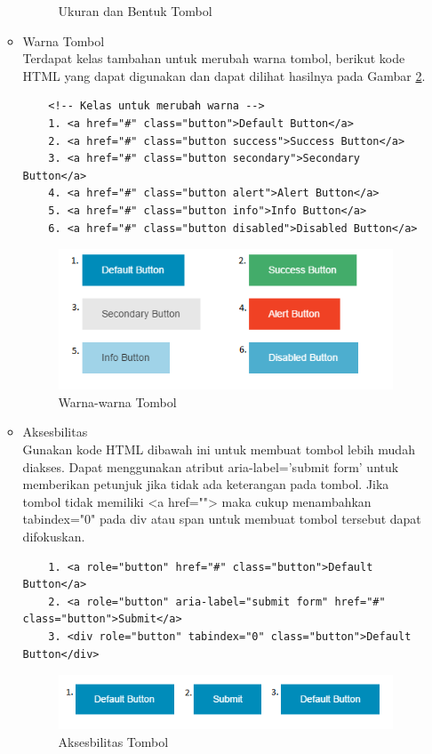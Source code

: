 \begin{enumerate}[(1)]
\begin{itemize}
\begin{figure}[H]
	\caption[Ukuran dan Bentuk Tombol]{Ukuran dan Bentuk Tombol}
	\label{fig:ukurantombol}
	\end{figure}
  \item Warna Tombol\\
  Terdapat kelas tambahan untuk merubah warna tombol, berikut kode
  HTML yang dapat digunakan dan dapat dilihat hasilnya pada Gambar
  \ref{fig:warnatombol}.
  	\begin{lstlisting}
  	<!-- Kelas untuk merubah warna -->
	1. <a href="#" class="button">Default Button</a>
	2. <a href="#" class="button success">Success Button</a>
	3. <a href="#" class="button secondary">Secondary Button</a>
	4. <a href="#" class="button alert">Alert Button</a>
	5. <a href="#" class="button info">Info Button</a>
	6. <a href="#" class="button disabled">Disabled Button</a>
  	\end{lstlisting}
  	\begin{figure}[H]
	\centering
	\includegraphics[scale=1]{Gambar/warnatombol.png}
	\caption[Warna-warna Tombol]{Warna-warna Tombol}
	\label{fig:warnatombol}
	\end{figure}
  \item Aksesbilitas\\
  Gunakan kode HTML dibawah ini untuk membuat tombol lebih mudah diakses. Dapat
  menggunakan atribut aria-label='submit form' untuk memberikan petunjuk jika
  tidak ada keterangan pada tombol. Jika tombol tidak memiliki <a href="">
  maka cukup menambahkan tabindex="0" pada div atau span untuk membuat tombol
  tersebut dapat difokuskan.
  	\begin{lstlisting}
  	1. <a role="button" href="#" class="button">Default Button</a>
	2. <a role="button" aria-label="submit form" href="#" class="button">Submit</a>
	3. <div role="button" tabindex="0" class="button">Default Button</div>
  	\end{lstlisting}
  	\begin{figure}[H]
	\centering
	\includegraphics[scale=1]{Gambar/aksesbilitastombol.png}
	\caption[Aksesbilitas Tombol]{Aksesbilitas Tombol}
	\label{fig:aksesbilitastombol}
	\end{figure}
\end{itemize}


\end{enumerate}
